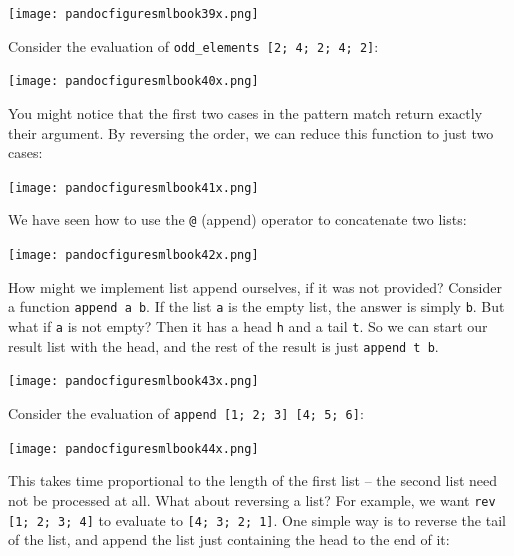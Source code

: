 \documentclass[]{book}
\newcommand{\smspace}{\vspace{4mm}}
\begin{document}
\medskip
\begin{center}
\noindent\texttt{[image: pandocfiguresmlbook39x.png]}
\end{center}
\medskip
\smspace

\noindent Consider the evaluation of \texttt{odd\_elements [2; 4; 2; 4; 2]}:

\medskip
\begin{center}
\noindent\texttt{[image: pandocfiguresmlbook40x.png]}
\end{center}
\medskip

\noindent You might notice that the first two cases in the pattern match return exactly their argument. By reversing the order, we can reduce this function to just two cases:

\medskip
\begin{center}
\noindent\texttt{[image: pandocfiguresmlbook41x.png]}
\end{center}
\medskip

\noindent We have seen how to use the \texttt{@} (append) operator to concatenate two lists:

\medskip
\begin{center}
\noindent\texttt{[image: pandocfiguresmlbook42x.png]}
\end{center}
\medskip

\noindent How might we implement list append ourselves, if it was not provided? Consider a function \texttt{append a b}. If the list \texttt{a} is the empty list, the answer is simply \texttt{b}. But what if \texttt{a} is not empty? Then it has a head \texttt{h} and a tail \texttt{t}. So we can start our result list with the head, and the rest of the result is just \texttt{append t b}.

\medskip
\begin{center}
\noindent\texttt{[image: pandocfiguresmlbook43x.png]}
\end{center}
\medskip

\noindent Consider the evaluation of \texttt{append [1; 2; 3] [4; 5; 6]}:

\medskip
\begin{center}
\noindent\texttt{[image: pandocfiguresmlbook44x.png]}
\end{center}
\medskip

\noindent This takes time proportional to the length of the first list -- the second list need not be processed at all. What about reversing a list? For example, we want \texttt{rev [1; 2; 3; 4]} to evaluate to \texttt{[4; 3; 2; 1]}. One simple way is to reverse the tail of the list, and append the list just containing the head to the end of it:
\end{document}
